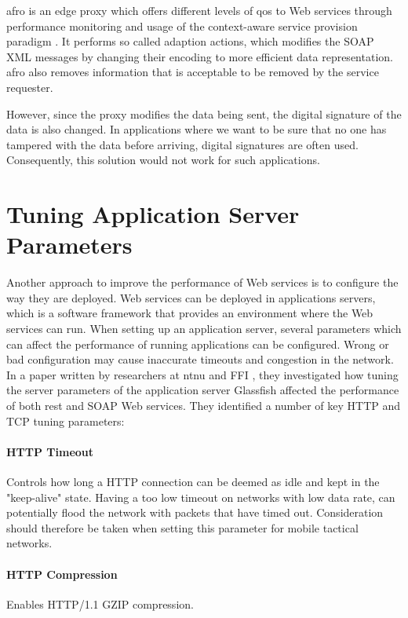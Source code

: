 \gls{afro} is an edge proxy which offers different levels of \gls{qos} to Web
services through performance monitoring and usage of the context-aware service
provision paradigm \cite{ist-090}. It performs so called adaption actions, which
modifies the SOAP XML messages by changing their encoding to more efficient data
representation. \gls{afro} also removes information that is acceptable to be
removed by the service requester.

However, since the proxy modifies the data being sent, the digital signature of
the data is also changed. In applications where we want to be sure that no one
has tampered with the data before arriving, digital signatures are often used.
Consequently, this solution would not work for such applications.


\section{Tuning Application Server Parameters}

 Another approach to improve the performance of Web services is to configure
 the way they are deployed. Web services can be deployed in applications
 servers, which is a software framework that provides an environment where the
 Web services can run. When setting up an application server, several parameters
 which can affect the performance of running applications can be
 configured. Wrong or bad configuration may cause inaccurate timeouts and
 congestion in the network. In a paper written by researchers at \gls{ntnu} and
 FFI \cite{johnsen-recommendations}, they
 investigated how tuning the server parameters of the application server
 Glassfish affected the performance of both \gls{rest} and SOAP Web services.
 They identified a number of key HTTP and TCP tuning parameters:

\paragraph{HTTP Timeout} Controls how long a HTTP connection can be deemed as
idle and kept in the "keep-alive" state. Having a too low timeout on networks
with low data rate, can potentially flood the network with packets that have
timed out. Consideration should therefore be taken when setting this
parameter for mobile tactical networks.

\paragraph{HTTP Compression} Enables HTTP/1.1 GZIP compression.

